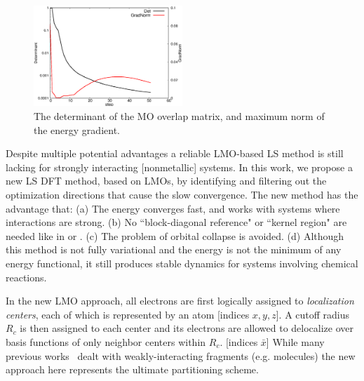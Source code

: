 \documentclass[aps,prl,twocolumn,reprint,amsmath,amssymb]{revtex4-1}
\begin{document}
\begin{figure}
\includegraphics[width=0.5\textwidth]{det}
\caption{The determinant of the MO overlap matrix, and maximum norm of the energy gradient. }
\label{fig:det}
\end{figure}

Despite multiple potential advantages a reliable LMO-based LS method is still lacking for strongly interacting [nonmetallic] systems. In this work, we propose a new LS DFT method, based on LMOs, by identifying and filtering out the optimization directions that cause the slow convergence. The new method has the advantage that: (a) The energy converges fast, and works with systems where interactions are strong. (b) No ``block-diagonal reference" or ``kernel region" are needed like in \cite{tsuchida2007augmented} or \cite{khaliullin2013efficient}.
(c) The problem of orbital collapse is avoided. (d) Although this method is not fully variational and the energy is not the minimum of any energy functional, it still produces stable dynamics for systems involving chemical reactions. 

\label{marker:theory} In the new LMO approach, all electrons are first logically assigned to \emph{localization centers}, each of which is represented by an atom [indices $x,y,z$]. A cutoff radius $R_c$ is then assigned to each center and its electrons are allowed to delocalize over basis functions of only neighbor centers within $R_c$. [indices $\bar{x}$] %
%
%
While many previous works~\cite{ZZZ} dealt with weakly-interacting fragments (e.g. molecules) the new approach here represents the ultimate partitioning scheme.
\end{document}
